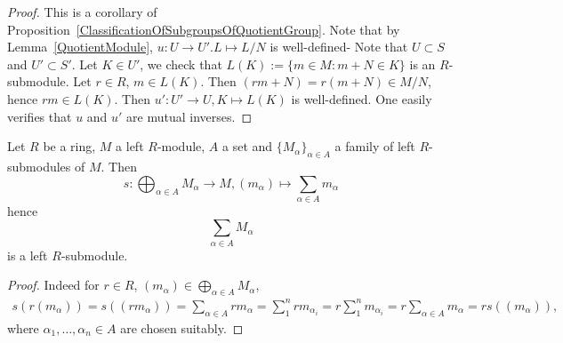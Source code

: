 \begin{proof}
     This is a corollary of Proposition~\ref{ClassificationOfSubgroupsOfQuotientGroup}. Note that by Lemma~\ref{QuotientModule}, $u:U\rightarrow U'. L\mapsto L/N$ is well-defined- Note that $U\subset S$ and $U'\subset S'$. Let $K\in U'$, we check that $L(K) := \{m\in M : m+N\in K\}$ is an $R$-submodule. Let $r\in R$, $m\in L(K)$. Then $(rm+N)=r(m+N)\in M/N$, hence $rm\in L(K)$. Then $u' : U'\rightarrow U, K\mapsto L(K)$ is well-defined. One easily verifies that $u$ and $u'$ are mutual inverses.   
\end{proof}
\begin{lemma}\label{SumOfSubmodulesIsSubmodule}
    Let $R$ be a ring, $M$ a left $R$-module, $A$ a set and $\{M_\alpha\}_{\alpha\in A}$ a family of left $R$-submodules of $M$. Then 
    $$
        s : \bigoplus_{\alpha\in A} M_\alpha \rightarrow M, (m_\alpha)\mapsto \sum_{\alpha\in A} m_\alpha
    $$ hence
    $$\sum_{\alpha\in A} M_\alpha$$
    is a left $R$-submodule.
\end{lemma}
\begin{proof}
    Indeed for $r\in R$, $(m_\alpha)\in \bigoplus_{\alpha\in A} M_\alpha$,
    \begin{align*}
        s(r(m_\alpha))=s((rm_\alpha))= \sum_{\alpha\in A} rm_\alpha = \sum_1^n rm_{\alpha_i}= r\sum_1^n m_{\alpha_i} = r\sum_{\alpha\in A} m_\alpha = rs((m_\alpha)),
    \end{align*}
    where $\alpha_1,\dots,\alpha_n\in A$ are chosen suitably.
\end{proof}

